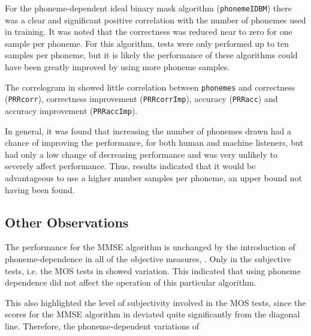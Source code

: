 For the phoneme-dependent ideal binary mask algorithm (\lstinline!phonemeIDBM!)
there was a clear and significant positive correlation with the number
of phonemes used in training. It was noted that the correctness was
reduced near to zero for one sample per phoneme. For this algorithm,
tests were only performed up to ten samples per phoneme, but it is
likely the performance of these algorithms could have been greatly
improved by using more phoneme samples. 

The correlogram in  showed little correlation between
\lstinline!phonemes! and correctness (\lstinline!PRRcorr!), correctness
improvement (\lstinline!PRRcorrImp!), accuracy (\lstinline!PRRacc!)
and accuracy improvement (\lstinline!PRRaccImp!).

In general, it was found that increasing the number of phonemes drawn
had a chance of improving the performance, for both human and machine
listeners, but had only a low change of decreasing performance and
was very unlikely to severely affect performance. Thus, results indicated
that it would be advantageous to use a higher number samples per phoneme,
an upper bound not having been found.


\subsection{Other Observations}

The performance for the \ac{MMSE} algorithm is unchanged by the introduction
of phoneme-dependence in all of the objective measures, .
Only in the subjective tests, i.e. the \ac{MOS} tests in 
showed variation. This indicated that using phoneme dependence did
not affect the operation of this particular algorithm.

This also highlighted the level of subjectivity involved in the \ac{MOS}
tests, since the scores for the \ac{MMSE} algorithm in 
deviated quite significantly from the diagonal line. Therefore, the
phoneme-dependent variations of 
